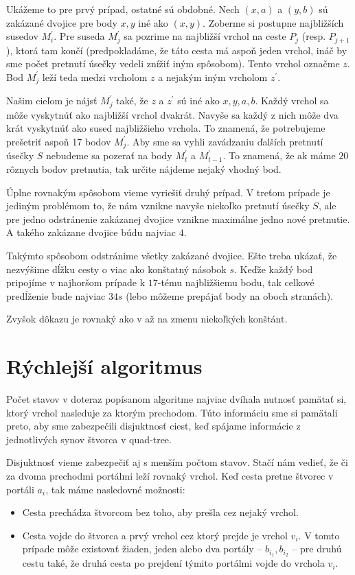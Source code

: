 \begin{dokaz}
Ukážeme to pre prvý prípad, ostatné sú obdobné. 
Nech $(x, a)$ a $(y, b)$ sú zakázané dvojice pre body $x, y$ iné ako $(x,y)$. 
Zoberme si postupne najbližších susedov $M_i^{'}$. Pre suseda $M^{'}_j$ sa pozrime na najbližší vrchol na
ceste $P_j$ (resp. $P_{j+1}$), ktorá tam končí (predpokladáme, že táto cesta má aspoň jeden vrchol, ináč by sme počet
pretnutí úsečky vedeli znížiť iným spôsobom). Tento vrchol označme $z$. Bod $M^{'}_j$ leží teda
medzi vrcholom $z$ a nejakým iným vrcholom $z^{'}$.  

Našim cieľom je nájsť $M_j^{'}$ také, že $z$ a $z^{'}$ sú iné ako $x, y, a, b$. Každý vrchol sa môže
vyskytnúť ako najbližší vrchol dvakrát. Navyše sa každý z nich môže dva krát vyskytnúť ako sused
najbližšieho vrchola. To znamená, že potrebujeme prešetriť aspoň 17 bodov $M_j^{'}$.
Aby sme sa vyhli zavádzaniu ďalších pretnutí úsečky $S$ nebudeme sa pozerať na body $M_t^{'}$ a
$M_{t-1}^{'}$. To znamená, že ak máme $20$ rôznych bodov pretnutia, tak určite nájdeme nejaký vhodný bod.

Úplne rovnakým spôsobom vieme vyriešiť druhý prípad. V treťom prípade je jediným problémom to, že
nám vznikne navyše niekoľko pretnutí úsečky $S$, ale pre jedno odstránenie zakázanej dvojice vznikne
maximálne jedno nové pretnutie. A takého zakázane dvojice búdu najviac $4$. 

Takýmto spôsobom odstránime všetky zakázané dvojice. Ešte treba ukázať, že nezvýšime dĺžku cesty
o viac ako konštatný násobok $s$. Keďže každý bod pripojíme v najhoršom prípade k $17$-tému
najbližšiemu bodu, tak celkové predĺženie bude najviac $34s$ (lebo môžeme prepájať body na oboch
stranách). 
\end{dokaz}

Zvyšok dôkazu je rovnaký ako v \cite{Arora} až na zmenu niekoľkých konštánt.

\section{Rýchlejší algoritmus}

Počet stavov v doteraz popísanom algoritme najviac dvíhala nutnosť pamätať si, ktorý vrchol
nasleduje za ktorým prechodom. Túto informáciu sme si pamätali preto, aby sme zabezpečili
disjuktnosť ciest, keď spájame informácie z jednotlivých synov štvorca v quad-tree.

Disjuktnosť vieme zabezpečiť aj s menším počtom stavov.
Stačí nám vedieť, že či za dvoma prechodmi portálmi leží rovnaký vrchol.
Keď cesta pretne štvorec v portáli $a_i$, tak máme nasledovné možnosti:
\begin{itemize}
\item Cesta prechádza štvorcom bez toho, aby prešla cez nejaký vrchol.
\item Cesta vojde do štvorca a prvý vrchol cez ktorý prejde je vrchol $v_i$.
V tomto prípade môže existovať žiaden, jeden alebo dva portály -- $b_{i_1}, b_{i_2}$ --
pre druhú cestu také, že druhá cesta po prejdení týmito portálmi vojde
do vrchola $v_i$.
\end{itemize}

